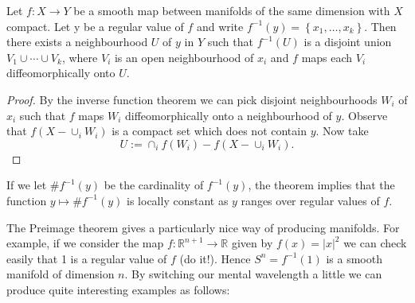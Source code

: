 \begin{theorem}\label{thm:stackofrecords}
    Let $f: X \rightarrow Y$ be a smooth map between manifolds of the same dimension with $X$ compact. Let y be a regular value of $f$ and write $f^{-1}(y)=\left\{x_{1}, \ldots, x_{k}\right\}$. Then there exists a neighbourhood $U$ of $y$ in $Y$ such that $f^{-1}(U)$ is a disjoint union $V_{1} \cup \cdots \cup V_{k}$, where $V_{i}$ is an open neighbourhood of $x_{i}$ and $f$ maps each $V_{i}$ diffeomorphically onto $U$.
\end{theorem}
\begin{proof}
    By the inverse function theorem we can pick disjoint neighbourhoods $W_{i}$ of $x_{i}$ such that $f$ maps $W_{i}$ diffeomorphically onto a neighbourhood of $y$. Observe that $f\left(X-\cup_{i} W_{i}\right)$ is a compact set which does not contain $y$. Now take
$$
U:=\cap_{i} f\left(W_{i}\right)-f\left(X-\cup_{i} W_{i}\right).
$$
\end{proof}


If we let $\# f^{-1}(y)$ be the cardinality of $f^{-1}(y)$, the theorem implies that the function $y \mapsto \# f^{-1}(y)$ is locally constant as $y$ ranges over regular values of $f$.

The Preimage theorem gives a particularly nice way of producing manifolds. For example, if we consider the map $f: \mathbb{R}^{n+1} \rightarrow \mathbb{R}$ given by $f(x)=|x|^{2}$ we can check easily that 1 is a regular value of $f$ (do it!). Hence $S^{n}=f^{-1}(1)$ is a smooth manifold of dimension $n$. By switching our mental wavelength a little we can produce quite interesting examples as follows:

